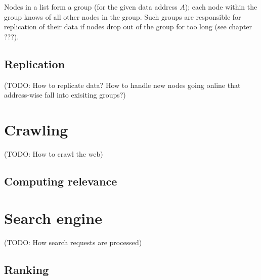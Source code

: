 \documentclass[a4paper,8pt,twocolumn]{scrartcl}
\begin{document}
Nodes in a list form a group (for the given data address $A$); each node within the group knows of all other nodes in the group. Such groups are responsible for replication of their data if nodes drop out of the group for too long (see chapter ???).

\subsection{Replication}

(TODO: How to replicate data? How to handle new nodes going online that address-wise fall into exisiting groups?)

\section{Crawling}

(TODO: How to crawl the web)

\subsection{Computing relevance}

\section{Search engine}

(TODO: How search requests are processed)

\subsection{Ranking}


%
\end{document}
